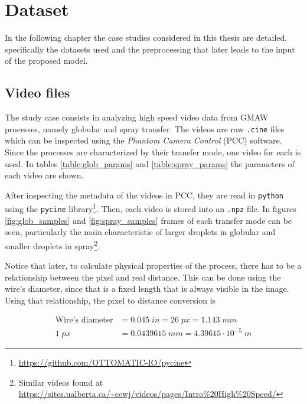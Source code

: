 \chapter{Dataset}\label{chap:dataset}
In the following chapter the case studies considered in this thesis are detailed, specifically the datasets used and the preprocessing that later leads to the input of the proposed model.

\section{Video files}
The study case consists in analyzing high speed video data from GMAW processes, namely globular and spray transfer. The videos are raw \texttt{.cine} files which can be inspected using the \textit{Phantom Camera Control} (PCC) software. Since the processes are characterized by their transfer mode, one video for each is used. In tables \ref{table:glob_params} and \ref{table:spray_params} the parameters of each video are shown. 

After inspecting the metadata of the videos in PCC, they are read in \texttt{python} using the \texttt{pycine} library\footnote{\url{https://github.com/OTTOMATIC-IO/pycine}}. Then, each video is stored into an \texttt{.npz} file. In figures \ref{fig:glob_samples} and \ref{fig:spray_samples} frames of each transfer mode can be seen, particularly the main characteristic of larger droplets in globular and smaller droplets in spray\footnote{Similar videos found at \url{https://sites.ualberta.ca/~ccwj/videos/pages/Intro\%20High\%20Speed/}}.

Notice that later, to calculate physical properties of the process, there has to be a relationship between the pixel and real distance. This can be done using the wire's diameter, since that is a fixed length that is always visible in the image. Using that relationship, the pixel to distance conversion is

\begin{align}
    \text{Wire's diameter} &= 0.045\;in = 26\;px = 1.143\;mm \nonumber\\
    1\;px &= 0.0439615\;mm =4.39615\cdot 10^{-5}\;m
    \label{eq:px_to_mm}
\end{align}

